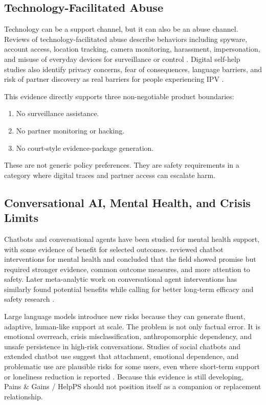 \documentclass[11pt]{article}
\begin{document}
\subsection{Technology-Facilitated Abuse}

Technology can be a support channel, but it can also be an abuse channel. Reviews of technology-facilitated abuse describe behaviors including spyware, account access, location tracking, camera monitoring, harassment, impersonation, and misuse of everyday devices for surveillance or control \citep{rogers2023,kim2023}. Digital self-help studies also identify privacy concerns, fear of consequences, language barriers, and risk of partner discovery as real barriers for people experiencing IPV \citep{micklitz2023}.

This evidence directly supports three non-negotiable product boundaries:

\begin{enumerate}
  \item No surveillance assistance.
  \item No partner monitoring or hacking.
  \item No court-style evidence-package generation.
\end{enumerate}

These are not generic policy preferences. They are safety requirements in a category where digital traces and partner access can escalate harm.

\subsection{Conversational AI, Mental Health, and Crisis Limits}

Chatbots and conversational agents have been studied for mental health support, with some evidence of benefit for selected outcomes. \citet{abdalrazaq2020} reviewed chatbot interventions for mental health and concluded that the field showed promise but required stronger evidence, common outcome measures, and more attention to safety. Later meta-analytic work on conversational agent interventions has similarly found potential benefits while calling for better long-term efficacy and safety research \citep{he2023}.

Large language models introduce new risks because they can generate fluent, adaptive, human-like support at scale. The problem is not only factual error. It is emotional overreach, crisis misclassification, anthropomorphic dependency, and unsafe persistence in high-risk conversations. Studies of social chatbots and extended chatbot use suggest that attachment, emotional dependence, and problematic use are plausible risks for some users, even where short-term support or loneliness reduction is reported \citep{pentina2023,fang2025}. Because this evidence is still developing, Pains \& Gains / HelpPS should not position itself as a companion or replacement relationship.
\end{document}
